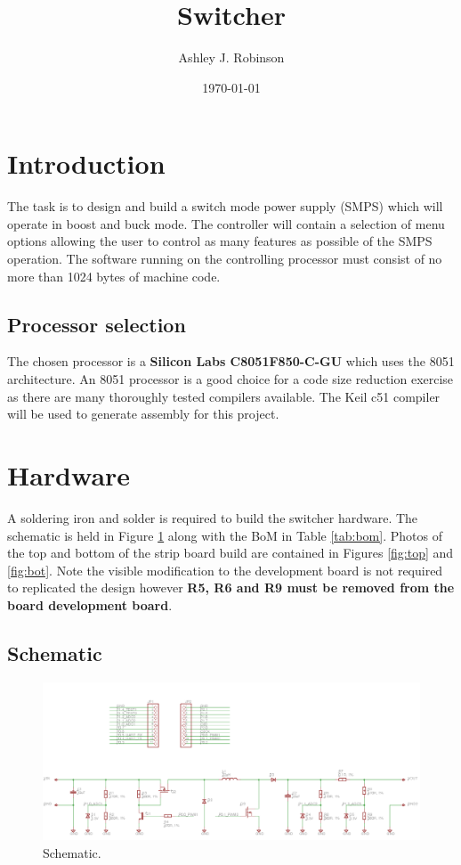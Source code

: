 \documentclass[12pt]{article}%
\begin{document}
\title{Switcher}
\author{Ashley J. Robinson}
\date{\today}
\maketitle
\section{Introduction}

The task is to design and build a switch mode power supply (SMPS) which will operate in boost and buck mode. The controller will contain a selection of menu options allowing the user to control as many features as possible of the SMPS operation. The software running on the controlling processor must consist of no more than 1024 bytes of machine code.

\subsection{Processor selection}

The chosen processor is a \textbf{Silicon Labs C8051F850-C-GU} which uses the 8051 architecture. An 8051 processor is a good choice for a code size reduction exercise as there are many thoroughly tested compilers available. The Keil c51 compiler will be used to generate assembly for this project.

\section{Hardware}

A soldering iron and solder is required to build the switcher hardware. The schematic is held in Figure \ref{fig:sch} along with the BoM in Table \ref{tab:bom}. Photos of the top and bottom of the strip board build are contained in Figures \ref{fig:top} and \ref{fig:bot}. Note the visible modification to the development board is not required to replicated the design however \textbf{R5, R6 and R9 must be removed from the board development board}.

\subsection{Schematic}

\begin{figure}[H]
	\centering
  	\includegraphics[width=16cm]{sch.png}
  	\caption{Schematic.}
  	\label{fig:sch}
\end{figure}
\end{document}
